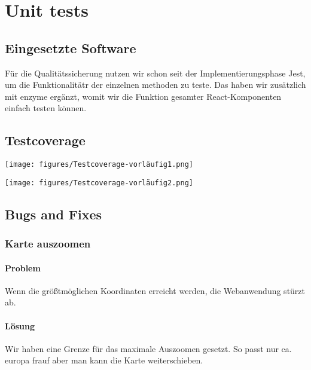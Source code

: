 \section{Unit tests}

\subsection{Eingesetzte Software}

Für die Qualitätssicherung nutzen wir schon seit der Implementierungsphase Jest, um die Funktionalitätr der einzelnen methoden zu teste. Das haben wir zusätzlich mit enzyme ergänzt, womit wir die Funktion gesamter React-Komponenten einfach testen können.

\subsection{Testcoverage}
\texttt{[image: figures/Testcoverage-vorläufig1.png]}\par\vspace{1cm}
\texttt{[image: figures/Testcoverage-vorläufig2.png]}\par\vspace{1cm}

\subsection{Bugs and Fixes}

\subsubsection{Karte auszoomen}
\paragraph{Problem}
Wenn die größtmöglichen Koordinaten erreicht werden, die Webanwendung stürzt ab.

\paragraph{Lösung}
Wir haben eine Grenze für das maximale Auszoomen gesetzt. So passt nur ca. europa frauf aber man kann die Karte weiterschieben.


